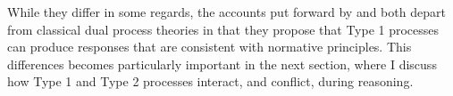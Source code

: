 
While they differ in some regards,
the accounts put forward by \citet{DeNeys2012} and \citet{Handley2015}
both depart from classical dual process theories in that
they propose that Type 1 processes can produce responses
that are consistent with normative principles.
This differences becomes particularly important in the next section,
where I discuss how Type 1 and Type 2 processes interact, and conflict,
during reasoning.
